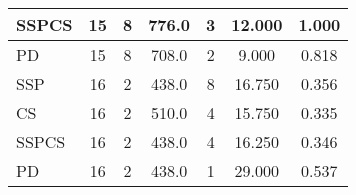 \documentclass{article}
\begin{document}
\begin{table}[H]
{\begin{tabular}{|l|c|c|c|c|c|c|}
SSPCS              & 15             & 8                 & 776.0                  & 3              & 12.000                    & 1.000                                   \\ \hline
PD                 & 15             & 8                 & 708.0                  & 2              & 9.000                     & 0.818                                   \\ \hline
\hhline{|=======|}
SSP                & 16             & 2                 & 438.0                  & 8              & 16.750                    & 0.356                                   \\ \hline
CS                 & 16             & 2                 & 510.0                  & 4              & 15.750                    & 0.335                                   \\ \hline
SSPCS              & 16             & 2                 & 438.0                  & 4              & 16.250                    & 0.346                                   \\ \hline
PD                 & 16             & 2                 & 438.0                  & 1              & 29.000                    & 0.537                                   \\ \hline
\end{tabular}%
}
\label{tab:simulation2_set2_algorithm_metrics}
\end{table}


\begin{table}[H]
\centering
\caption{Simulation 2, Set 3: Graph Characteristics}
\label{tab:simulation2_set3_graph_characteristics}
\end{table}
\end{document}
